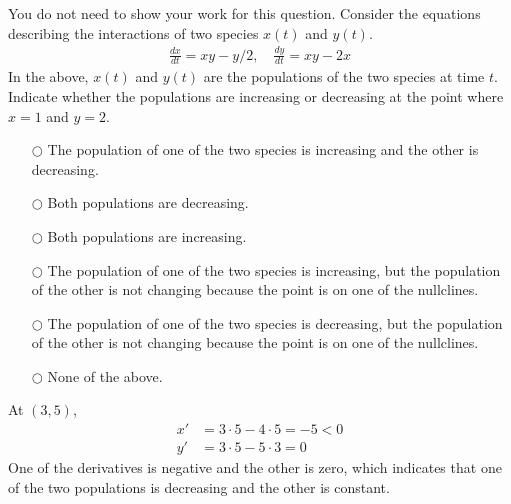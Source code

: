 \ifnum {}
\question[1] You do not need to show your work for this question. Consider the equations describing the interactions of two species $x(t)$ and $y(t)$.
\begin{align}
    \frac{dx}{dt} = xy-y/2, \quad \frac{dy}{dt} = xy-2x
\end{align}
In the above, $x(t)$ and $y(t)$ are the populations of the two species at time $t$. Indicate whether the populations are increasing or decreasing at the point where $x=1$ and $y=2$. 
\begin{itemize}
    \item[$\bigcirc$] The population of one of the two species is increasing and the other is decreasing. 
    \item[$\bigcirc$]Both populations are decreasing.
    \item[$\bigcirc$]Both populations are increasing.
    \item[$\bigcirc$]The population of one of the two species is increasing, but the population of the other is not changing because the point is on one of the nullclines. 
    \item[$\bigcirc$]The population of one of the two species is decreasing, but the population of the other is not changing because the point is on one of the nullclines. 
    \item[$\bigcirc$]None of the above.
\end{itemize}
\ifnum {} {\color{DarkBlue}
At $(3,5)$, 
\begin{align}
    x' &= 3\cdot5 - 4\cdot 5 = - 5 < 0\\
    y' &= 3\cdot5-5\cdot3 = 0 
\end{align}
One of the derivatives is negative and the other is zero, which indicates that one of the two populations is decreasing and the other is constant. 
} 
\else 
\vspace{0.5cm}
\fi    
\fi 



